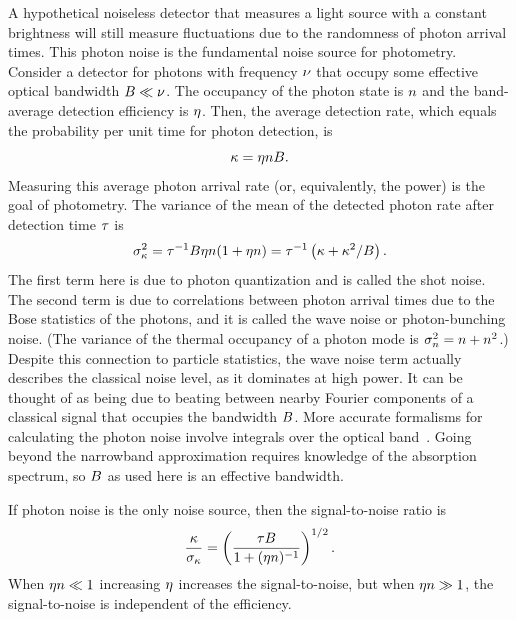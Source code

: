 A hypothetical noiseless detector that measures a light source with a constant brightness will still measure fluctuations due to the randomness of photon arrival times.
This photon noise is the fundamental noise source for photometry.
Consider a detector for photons with frequency $\nu$ that occupy some effective optical bandwidth
$B \ll \nu$.
The occupancy of the photon state is $n$ and the band-average detection efficiency is $\eta$.
Then, the average detection rate, which equals the probability per unit time for photon detection, is
\begin{equation}
\kappa
  =
  \eta n B.
\end{equation}
Measuring this average photon arrival rate (or, equivalently, the power) is the goal of photometry.
The variance of the mean of the detected photon rate after detection time $\tau$ is~\autocite{Zmuidzinas2003ApplOpt}
\begin{equation}
\sigma_\kappa^2
  =
  \tau^{-1} B \eta n (1 + \eta n)
  =
  \tau^{-1} \left( \kappa + \kappa^2 / B \right).
\label{eqn:variance_mean_eventrate}
\end{equation}
The first term here is due to photon quantization and is called the shot noise.
The second term is due to correlations between photon arrival times due to the Bose statistics of the photons, and it is called the wave noise or photon-bunching noise.
(The variance of the thermal occupancy of a photon mode is $\sigma_n^2 = n + n^2$.)
Despite this connection to particle statistics, the wave noise term actually describes the classical noise level, as it dominates at high power.
It can be thought of as being due to beating between nearby Fourier components of a classical signal that occupies the bandwidth $B$.
More accurate formalisms for calculating the photon noise involve integrals over the optical band~\autocite{Zmuidzinas2003ApplOpt}.
Going beyond the narrowband approximation requires knowledge of the absorption spectrum, so $B$ as used here is an effective bandwidth.

If photon noise is the only noise source, then the signal-to-noise ratio is
\begin{equation}
\frac{\kappa}{\sigma_\kappa}
  =
  \left(
  \frac{\tau B}
  {1 + (\eta n)^{-1}}
  \right)^{1/2}.
\end{equation}
When $\eta n \ll 1$ increasing $\eta$ increases the signal-to-noise, but when $\eta n \gg 1$, the signal-to-noise is independent of the efficiency.


